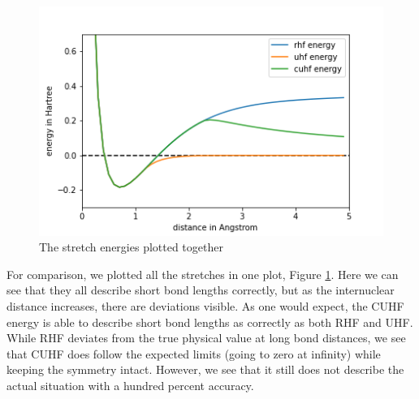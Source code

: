 \documentclass[twoside,twocolumn,9pt]{article}
\begin{document}
\begin{center}
  \begin{figure}[h]
    \includegraphics[width=\linewidth]{./../notes/figures/combo.png}
    \caption{The stretch energies plotted together}
    \label{fig:combo}
  \end{figure}
\end{center}

For comparison, we plotted all the stretches in one plot, Figure \ref{fig:combo}. Here we can see that they all describe short bond lengths correctly, but as the internuclear distance
increases, there are deviations visible. As one would expect, the CUHF energy is able to describe short bond lengths as correctly as both RHF and UHF. While RHF deviates from the
true physical value at long bond distances, we see that CUHF does follow the expected limits (going to zero at infinity) while keeping the symmetry intact. However, we see that it still
does not describe the actual situation with a hundred percent accuracy.
\end{document}

